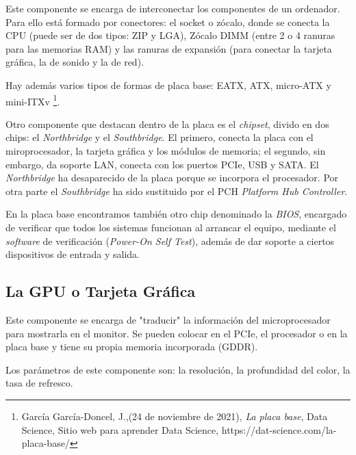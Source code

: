 \documentclass{book}
\begin{document}
\begin{large}

    Este componente se encarga de interconectar los componentes de un ordenador. Para ello está formado por conectores: el socket o zócalo, donde se conecta la CPU (puede ser de dos tipos: ZIP y LGA), Zócalo DIMM (entre 2 o 4 ranuras para las memorias RAM) y las ranuras de expansión (para conectar la tarjeta gráfica, la de sonido y la de red).

    Hay además varios tipos de formas de placa base: EATX, ATX, micro-ATX y mini-ITXv \footnote{\normalsize García García-Doncel, J.,(24 de noviembre de 2021), \textit{La placa base}, Data Science, Sitio web para aprender Data Science, https://dat-science.com/la-placa-base/}.

    Otro componente que destacan dentro de la placa es el \textit{chipset}, divido en dos chips: el  \textit{Northbridge} y el \textit{Southbridge}. El primero, conecta la placa con el miroprocesador, la tarjeta gráfica y los módulos de memoria; el segundo, sin embargo, da soporte LAN, conecta con los puertos PCIe, USB y SATA. El \textit{Northbridge} ha desaparecido de la placa porque se incorpora el procesador. Por otra parte el \textit{Southbridge} ha sido sustituido por el PCH \textit{Platform Hub Controller}.

    En la placa base encontramos también otro chip denominado la  \textit{BIOS}, encargado de verificar que todos los sistemas funcionan al arrancar el equipo, mediante el \textit{software} de verificación (\textit{Power-On Self Test}), además de dar soporte a ciertos dispositivos de entrada y salida.

\end{large}

\subsection{\textbf{La GPU o Tarjeta Gráfica}}

\begin{large}
    Este componente se encarga de "traducir" la información del microprocesador para mostrarla en el monitor.
    Se pueden colocar en el PCIe, el procesador o en la placa base y tiene su propia memoria incorporada (GDDR).

    Los parámetros de este componente son: la resolución, la profundidad del color, la tasa de refresco.

\end{large}
\end{document}
